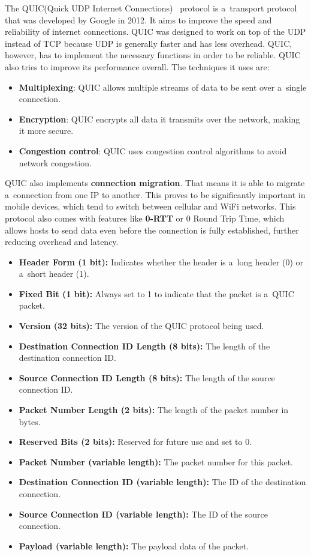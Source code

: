 \documentclass[
  printed,     %
  color,       %
  oneside,     %
  nosansbold,  %
  nocolorbold, %
  nolof,         %
  nolot,         %
]{fithesis4}
\begin{document}
The QUIC(Quick UDP Internet Connections)~\cite{RFC9000} protocol is a~transport protocol that was developed by Google in 2012. It aims to improve the speed and reliability of internet connections. QUIC was designed to work on top of the UDP instead of TCP because UDP is generally faster and has less overhead. QUIC, however, has to implement the necessary functions in order to be reliable. QUIC also tries to improve its performance overall. The techniques it uses are:

\begin{itemize}
    \item \textbf{Multiplexing}: QUIC allows multiple streams of data to be sent over a~single connection.
    \item \textbf{Encryption}: QUIC encrypts all data it transmits over the network, making it more secure.
    \item \textbf{Congestion control}: QUIC uses congestion control algorithms to avoid network congestion.
\end{itemize}

QUIC also implements \textbf{connection migration}. That means it is able to migrate a~connection from one IP to another. This proves to be significantly important in mobile devices, which tend to switch between cellular and WiFi networks. This protocol also comes with features like \textbf{0-RTT} or 0 Round Trip Time, which allows hosts to send data even before the connection is fully established, further reducing overhead and latency.

\begin{itemize}[noitemsep,topsep=0pt]
    \item \textbf{Header Form (1 bit):} Indicates whether the header is a~long header (0) or a~short header (1).
    \item \textbf{Fixed Bit (1 bit):} Always set to 1 to indicate that the packet is a~QUIC packet.
    \item \textbf{Version (32 bits):} The version of the QUIC protocol being used.
    \item \textbf{Destination Connection ID Length (8 bits):} The length of the destination connection ID.
    \item \textbf{Source Connection ID Length (8 bits):} The length of the source connection ID.
    \item \textbf{Packet Number Length (2 bits):} The length of the packet number in bytes.
    \item \textbf{Reserved Bits (2 bits):} Reserved for future use and set to 0.
    \item \textbf{Packet Number (variable length):} The packet number for this packet.
    \item \textbf{Destination Connection ID (variable length):} The ID of the destination connection.
    \item \textbf{Source Connection ID (variable length):} The ID of the source connection.
    \item \textbf{Payload (variable length):} The payload data of the packet.
\end{itemize}
\end{document}
